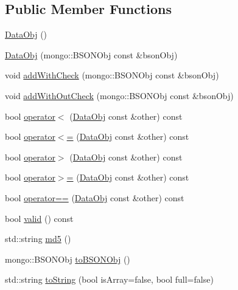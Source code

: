 \subsection*{Public Member Functions}
\begin{DoxyCompactItemize}
\item 
\hyperlink{classunisys_1_1DataObj_a4d237aaadda27adda13c026e0fdc944e}{Data\-Obj} ()
\item 
\hyperlink{classunisys_1_1DataObj_ab6c5ea140ad5abe24f6dfcbf40176b25}{Data\-Obj} (mongo\-::\-B\-S\-O\-N\-Obj const \&bson\-Obj)
\item 
void \hyperlink{classunisys_1_1DataObj_a3b0243f24755d8ce190486e1c552c6ac}{add\-With\-Check} (mongo\-::\-B\-S\-O\-N\-Obj const \&bson\-Obj)
\item 
void \hyperlink{classunisys_1_1DataObj_a53cfd20ae94853de0407d8328e0eb4fb}{add\-With\-Out\-Check} (mongo\-::\-B\-S\-O\-N\-Obj const \&bson\-Obj)
\item 
bool \hyperlink{classunisys_1_1DataObj_adcbef6f39839328f235674bf10d4309c}{operator$<$} (\hyperlink{classunisys_1_1DataObj}{Data\-Obj} const \&other) const 
\item 
bool \hyperlink{classunisys_1_1DataObj_ab9a18d2b433bff7b1e5bea4bd5fb6090}{operator$<$=} (\hyperlink{classunisys_1_1DataObj}{Data\-Obj} const \&other) const 
\item 
bool \hyperlink{classunisys_1_1DataObj_a13b1c6af9106e32172c7fb3099bd627f}{operator$>$} (\hyperlink{classunisys_1_1DataObj}{Data\-Obj} const \&other) const 
\item 
bool \hyperlink{classunisys_1_1DataObj_acbe081c6f2b2d5531df234619880c090}{operator$>$=} (\hyperlink{classunisys_1_1DataObj}{Data\-Obj} const \&other) const 
\item 
bool \hyperlink{classunisys_1_1DataObj_ad737e7dd24ebf6fd2d77bd42183ab528}{operator==} (\hyperlink{classunisys_1_1DataObj}{Data\-Obj} const \&other) const 
\item 
bool \hyperlink{classunisys_1_1DataObj_a6e4042307576dc0ac8281819402bc250}{valid} () const 
\item 
std\-::string \hyperlink{classunisys_1_1DataObj_aa328fe2b63c53f761529723ad2e45406}{md5} ()
\item 
mongo\-::\-B\-S\-O\-N\-Obj \hyperlink{classunisys_1_1DataObj_ad79e34931486ad2a44b735243e8556d7}{to\-B\-S\-O\-N\-Obj} ()
\item 
std\-::string \hyperlink{classunisys_1_1DataObj_a7c1d7c36a04fdf4d0de279dc57868b0d}{to\-String} (bool is\-Array=false, bool full=false)
\item 

\end{DoxyCompactItemize}
